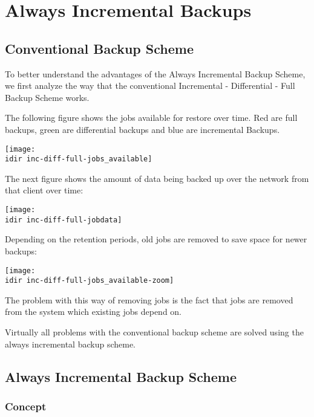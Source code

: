 \chapter{Always Incremental Backups}

\section{Conventional Backup Scheme}


To better understand the advantages of the Always Incremental Backup Scheme, we first analyze the way that the conventional Incremental - Differential - Full Backup Scheme works.

The following figure shows the jobs available for restore over time. Red are full backups, green are differential backups and blue are incremental Backups.

\begin{center}
\texttt{[image: \\idir inc-diff-full-jobs\_available]}
\end{center}


The next figure shows the amount of data being backed up over the network from that client over time:

\begin{center}
\texttt{[image: \\idir inc-diff-full-jobdata]}
\end{center}


Depending on the retention periods, old jobs are removed to save space for newer backups:

\begin{center}
\texttt{[image: \\idir inc-diff-full-jobs\_available-zoom]}
\end{center}

The problem with this way of removing jobs is the fact that jobs are removed from the system which existing jobs depend on.

Virtually all problems with the conventional backup scheme are solved using the always incremental backup scheme.


\section{Always Incremental Backup Scheme}

\subsection{Concept}

